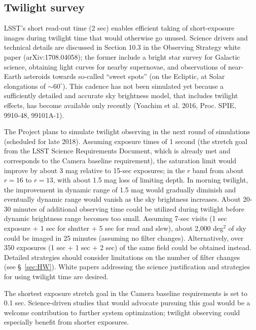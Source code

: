 \documentclass[DM,lsstdraft,toc,usenatbib]{lsstdoc}
\begin{document}

\subsection{Twilight survey \label{sec:twilight}} 

LSST's short read-out time (2 sec) enables efficient taking of short-exposure images during twilight time 
that would otherwise go unused. Science drivers and technical details are discussed in Section 10.3 in the 
Observing Strategy white paper (arXiv:1708.04058); the former include a bright star survey for Galactic
science, obtaining light curves for nearby supernovae, and observations of near-Earth asteroids towards
so-called ``sweet spots'' (on the Ecliptic, at Solar elongations of $\sim60^\circ$). This cadence has not 
been simulated yet because a sufficiently detailed and accurate sky brightness model, that includes twilight 
effects, has become available only recently (Yoachim et al. 2016, Proc. SPIE, 9910-48, 99101A-1). 

The Project plans to simulate twilight observing in the next round of simulations (scheduled for late 2018). 
Assuming exposure times of 1 second (the stretch goal from the LSST Science Requirements Document, 
which is already met and corresponds to the Camera baseline requirement), the saturation limit would 
improve by about 3 mag relative to 15-sec exposures; in the $r$ band from about $r=16$ to $r=13$,
with about 1.5 mag loss of limiting depth. In morning twilight, the improvement in dynamic range of 1.5 mag would gradually
diminish and eventually dynamic range would vanish as the sky brightness increases. About 20-30 minutes
of additional observing time could be utilized during twilight before dynamic brightness range becomes
too small. Assuming 7-sec visits (1 sec exposure + 1 sec for shutter + 5 sec for read and slew), about 
2,000 deg$^2$ of sky could be imaged in 25 minutes (assuming no filter changes). Alternatively, over 
350 exposures (1 sec + 1 sec + 2 sec) of the same field could be obtained instead.  Detailed strategies
should consider limitations on the number of filter changes (see \S~\ref{sec:HW}). 
White papers addressing the science justification and strategies for using twilight time are desired.

The shortest exposure stretch goal in the Camera baseline requirements is set to 0.1 sec. Science-driven
studies that would advocate pursuing this goal would be a welcome contribution to further system
optimization; twilight observing could especially benefit from shorter exposures. 
 
\end{document}
